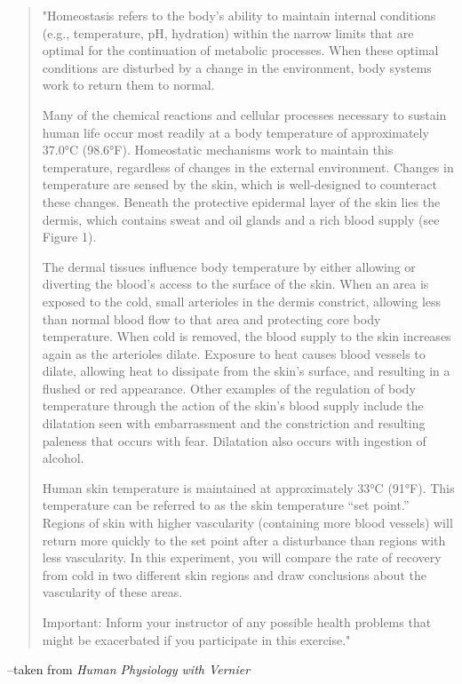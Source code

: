 \documentclass[12pt,oneside]{article}
\begin{document}
\begin{quote}
"Homeostasis refers to the body’s ability to maintain internal conditions (e.g., temperature, pH, hydration) within the narrow limits that are optimal for the continuation of metabolic processes. When these optimal conditions are disturbed by a change in the environment, body systems work to return them to normal. 

Many of the chemical reactions and cellular processes necessary to sustain human life occur most readily at a body temperature of approximately 37.0°C (98.6°F). Homeostatic mechanisms work to maintain this temperature, regardless of changes in the external environment. Changes in temperature are sensed by the skin, which is well-designed to counteract these changes. Beneath the protective epidermal layer of the skin lies the dermis, which contains sweat and oil glands and a rich blood supply (see Figure 1).

The dermal tissues influence body temperature by either allowing or diverting the blood’s access to the surface of the skin. When an area is exposed to the cold, small arterioles in the dermis constrict, allowing less than normal blood flow to that area and protecting core body temperature. When cold is removed, the blood supply to the skin increases again as the arterioles dilate. Exposure to heat causes blood vessels to dilate, allowing heat to dissipate from the skin’s surface, and resulting in a flushed or red appearance. Other examples of the regulation of body temperature through the action of the skin’s blood supply include the dilatation seen with embarrassment and the constriction and resulting paleness that occurs with fear. Dilatation also occurs with ingestion of alcohol. 

Human skin temperature is maintained at approximately 33°C (91°F). This temperature can be referred to as the skin temperature “set point.” Regions of skin with higher vascularity (containing more blood vessels) will return more quickly to the set point after a disturbance than regions with less vascularity. In this experiment, you will compare the rate of recovery from cold in two different skin regions and draw conclusions about the vascularity of these areas.

Important: Inform your instructor of any possible health problems that might be exacerbated if you participate in this exercise."
\end{quote}

--taken from \textit{Human Physiology with Vernier}
\end{document}
